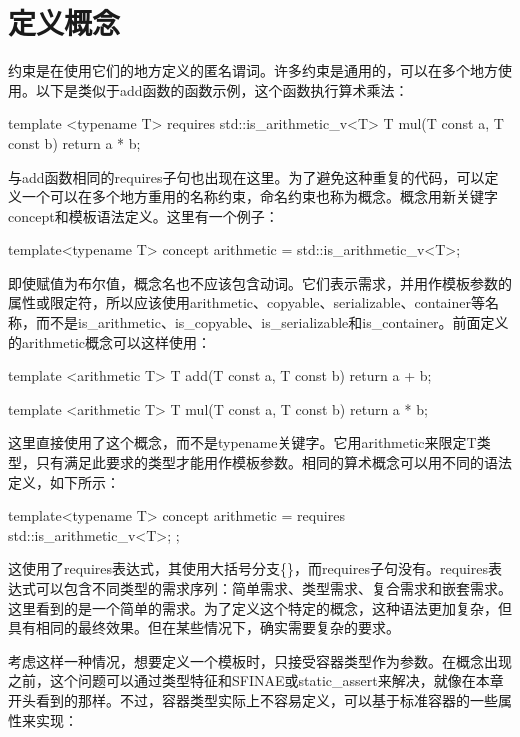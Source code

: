\section{定义概念}
约束是在使用它们的地方定义的匿名谓词。许多约束是通用的，可以在多个地方使用。以下是类似于add函数的函数示例，这个函数执行算术乘法：

\begin{cppcode}
template <typename T>
requires std::is_arithmetic_v<T>
T mul(T const a, T const b)
{
	return a * b;
}
\end{cppcode}

与add函数相同的requires子句也出现在这里。为了避免这种重复的代码，可以定义一个可以在多个地方重用的名称约束，命名约束也称为概念。概念用新关键字concept和模板语法定义。这里有一个例子：

\begin{cppcode}
template<typename T>
concept arithmetic = std::is_arithmetic_v<T>;
\end{cppcode}

即使赋值为布尔值，概念名也不应该包含动词。它们表示需求，并用作模板参数的属性或限定符，所以应该使用arithmetic、copyable、serializable、container等名称，而不是is_arithmetic、is_copyable、is_serializable和is_container。前面定义的arithmetic概念可以这样使用：

\begin{cppcode}
template <arithmetic T>
T add(T const a, T const b) { return a + b; }

template <arithmetic T>
T mul(T const a, T const b) { return a * b; }
\end{cppcode}

这里直接使用了这个概念，而不是typename关键字。它用arithmetic来限定T类型，只有满足此要求的类型才能用作模板参数。相同的算术概念可以用不同的语法定义，如下所示：

\begin{cppcode}
template<typename T>
concept arithmetic = requires { std::is_arithmetic_v<T>; };
\end{cppcode}

这使用了requires表达式，其使用大括号分支\{\}，而requires子句没有。requires表达式可以包含不同类型的需求序列：简单需求、类型需求、复合需求和嵌套需求。这里看到的是一个简单的需求。为了定义这个特定的概念，这种语法更加复杂，但具有相同的最终效果。但在某些情况下，确实需要复杂的要求。

考虑这样一种情况，想要定义一个模板时，只接受容器类型作为参数。在概念出现之前，这个问题可以通过类型特征和SFINAE或static_assert来解决，就像在本章开头看到的那样。不过，容器类型实际上不容易定义，可以基于标准容器的一些属性来实现：

